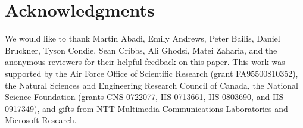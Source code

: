 \section*{Acknowledgments}
We would like to thank Martin Abadi, Emily Andrews, Peter Bailis, Daniel
Bruckner, Tyson Condie, Sean Cribbs, Ali Ghodsi, Matei Zaharia, and the
anonymous reviewers for their helpful feedback on this paper.  This work was
supported by the Air Force Office of Scientific Research (grant FA95500810352),
the Natural Sciences and Engineering Research Council of Canada, the National
Science Foundation (grants CNS-0722077, IIS-0713661, IIS-0803690, and
IIS-0917349), and gifts from NTT Multimedia Communications Laboratories and
Microsoft Research.
